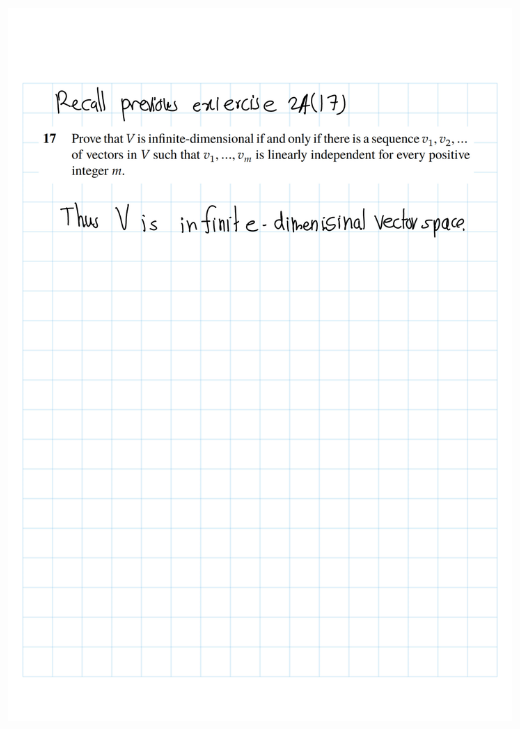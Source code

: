 \documentclass[
]{book}
\theoremstyle{definition}
\theoremstyle{definition}
\theoremstyle{definition}
\theoremstyle{definition}
\theoremstyle{remark}
\begin{document}
\includegraphics{fig/Ex2A/Ex2A-25.png}
\end{document}
